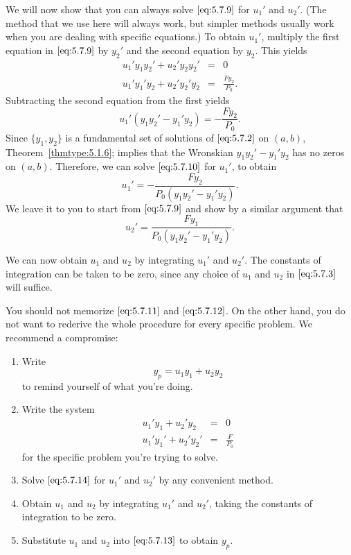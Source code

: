 \documentclass{ximera}
\begin{document}
We will now show that you can always solve $\eqref{eq:5.7.9}$ for $u_1'$
and $u_2'$. (The method that we use here will always work, but simpler methods usually work when you are dealing with specific equations.) To
obtain $u_1'$, multiply the first equation in $\eqref{eq:5.7.9}$ by $y_2'$
and the second equation by $y_2$. This yields
\begin{eqnarray*}
u_1'y_1y_2'+u_2'y_2y_2'&=& 0  \\
u_1'y_1'y_2+u_2'y_2'y_2 &=& \frac{Fy_2}{P_0}.
\end{eqnarray*}
Subtracting the second equation from the first yields
\begin{equation} \label{eq:5.7.10}
u_1'(y_1y_2'-y_1'y_2)=-\frac{Fy_2}{P_0}.
\end{equation}
Since $\{y_1,y_2\}$  is a fundamental set of solutions of $\eqref{eq:5.7.2}$
on $(a,b)$, Theorem~\ref{thmtype:5.1.6}; implies that the Wronskian
 $y_1y_2'-y_1'y_2$  has no zeros on $(a,b)$.  Therefore, we can solve $\eqref{eq:5.7.10}$ for $u_1'$, to obtain
\begin{equation} \label{eq:5.7.11}
u_1'=-\frac{Fy_2}{P_0(y_1y_2'-y_1'y_2)}.
\end{equation}
We leave it to you to start from $\eqref{eq:5.7.9}$ and show by a similar
argument that
\begin{equation} \label{eq:5.7.12}
u_2'=\frac{Fy_1}{P_0(y_1y_2'-y_1'y_2)}.
\end{equation}
 
We can now obtain $u_1$ and $u_2$ by integrating $u_1'$ and $u_2'$.
The constants of integration can be taken to be zero, since any choice
of $u_1$ and $u_2$ in $\eqref{eq:5.7.3}$ will suffice.
 
You should not memorize $\eqref{eq:5.7.11}$ and $\eqref{eq:5.7.12}$. On the
other hand, you do not want to rederive the whole procedure for every specific problem. We recommend a compromise:
\begin{enumerate}
\item\label{item:compromiseA} %
Write
\begin{equation} \label{eq:5.7.13}
y_p=u_1y_1+u_2y_2
\end{equation}
to remind yourself of what you're doing.
\item \label{item:compromiseB}%
Write the system
\begin{equation} \label{eq:5.7.14}
\begin{array}{rcl}
u_1'y_1+u_2'y_2 &=& 0  \\
u_1'y_1'+u_2'y_2' &=& \frac{F}{P_0}
\end{array}
\end{equation}
for the specific problem  you're trying to solve.
\item\label{item:compromiseC} %
Solve $\eqref{eq:5.7.14}$ for $u_1'$ and $u_2'$ by any convenient method.
\item \label{item:compromiseD}%
Obtain $u_1$ and $u_2$ by integrating $u_1'$ and $u_2'$,
taking the constants of integration to be zero.
\item \label{item:compromiseE}%
Substitute $u_1$ and $u_2$ into $\eqref{eq:5.7.13}$ to obtain $y_p$.
\end{enumerate}
 
\end{document}
